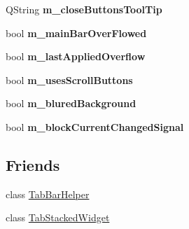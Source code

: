 \begin{DoxyCompactItemize}
\item 
\hypertarget{class_combo_tab_bar_aaa6fd8c84151411f93cbc1909a77410c}{
QString {\bfseries m\_\-closeButtonsToolTip}}
\label{class_combo_tab_bar_aaa6fd8c84151411f93cbc1909a77410c}

\item 
\hypertarget{class_combo_tab_bar_a51e2466e5de0923218a679b0299ea7ec}{
bool {\bfseries m\_\-mainBarOverFlowed}}
\label{class_combo_tab_bar_a51e2466e5de0923218a679b0299ea7ec}

\item 
\hypertarget{class_combo_tab_bar_acf0bfd89fb53d67b4aa02d4a992bae25}{
bool {\bfseries m\_\-lastAppliedOverflow}}
\label{class_combo_tab_bar_acf0bfd89fb53d67b4aa02d4a992bae25}

\item 
\hypertarget{class_combo_tab_bar_ab5f03aa77a741a36934334176badccaf}{
bool {\bfseries m\_\-usesScrollButtons}}
\label{class_combo_tab_bar_ab5f03aa77a741a36934334176badccaf}

\item 
\hypertarget{class_combo_tab_bar_a994055730c9a831aab48cee1ec91d74f}{
bool {\bfseries m\_\-bluredBackground}}
\label{class_combo_tab_bar_a994055730c9a831aab48cee1ec91d74f}

\item 
\hypertarget{class_combo_tab_bar_aaa4bb25bb3d32e338697d4c317d6135a}{
bool {\bfseries m\_\-blockCurrentChangedSignal}}
\label{class_combo_tab_bar_aaa4bb25bb3d32e338697d4c317d6135a}

\end{DoxyCompactItemize}
\subsection*{Friends}
\begin{DoxyCompactItemize}
\item 
\hypertarget{class_combo_tab_bar_a2c48367f51e58bbeaea3140bd86b5326}{
class \hyperlink{class_combo_tab_bar_a2c48367f51e58bbeaea3140bd86b5326}{TabBarHelper}}
\label{class_combo_tab_bar_a2c48367f51e58bbeaea3140bd86b5326}

\item 
\hypertarget{class_combo_tab_bar_ab30c27851131b8d8bec48bee17832d43}{
class \hyperlink{class_combo_tab_bar_ab30c27851131b8d8bec48bee17832d43}{TabStackedWidget}}
\label{class_combo_tab_bar_ab30c27851131b8d8bec48bee17832d43}

\end{DoxyCompactItemize}


